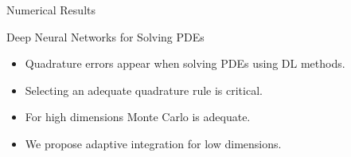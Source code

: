 \begin{frame}[t]{Numerical Results}
{  \begin{minipage}{.45\textwidth}
\begin{figure}[!htp]
\centering

 \end{figure}
\end{minipage}%
\hspace{1.5cm}
\begin{minipage}{.35\textwidth}
\vspace{-0.25cm}
\begin{figure}[!htp]
\centering

 \end{figure}
\end{minipage}%
 }
 
 \end{frame}


\begin{frame}{Deep Neural Networks for Solving PDEs}
\begin{itemize}
\item Quadrature errors appear when solving PDEs using DL methods.
\vspace{0.5cm}
\item Selecting an adequate quadrature rule is critical.
\vspace{0.5cm}
\item For high dimensions Monte Carlo is adequate.
\vspace{0.5cm}
\item We propose adaptive integration for low dimensions.
\end{itemize}
\end{frame}